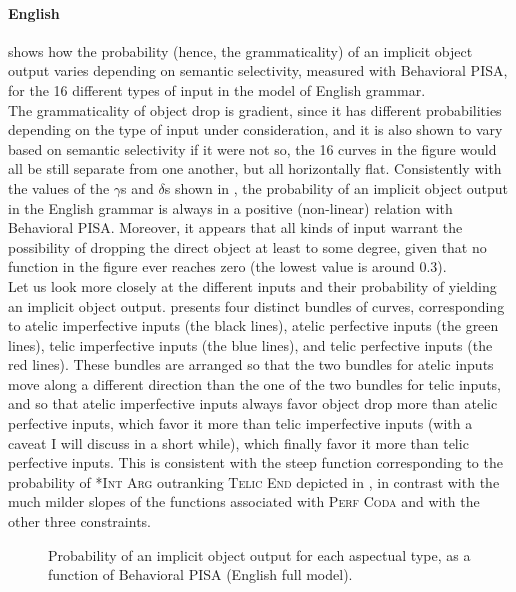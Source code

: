\paragraph{English} 
 shows how the probability (hence, the grammaticality) of an implicit object output varies depending on semantic selectivity, measured with Behavioral PISA, for the 16 different types of input in the model of English grammar.\\
The grammaticality of object drop is gradient, since it has different probabilities depending on the type of input under consideration, and it is also shown to vary based on semantic selectivity \textemdash if it were not so, the 16 curves in the figure would all be still separate from one another, but all horizontally flat. Consistently with the values of the $\gamma$s and $\delta$s shown in , the probability of an implicit object output in the English grammar is always in a positive (non-linear) relation with Behavioral PISA. Moreover, it appears that all kinds of input warrant the possibility of dropping the direct object at least to some degree, given that no function in the figure ever reaches zero (the lowest value is around 0.3).\\
Let us look more closely at the different inputs and their probability of yielding an implicit object output.  presents four distinct bundles of curves, corresponding to atelic imperfective inputs (the black lines), atelic perfective inputs (the green lines), telic imperfective inputs (the blue lines), and telic perfective inputs (the red lines). These bundles are arranged so that the two bundles for atelic inputs move along a different direction than the one of the two bundles for telic inputs, and so that atelic imperfective inputs always favor object drop more than atelic perfective inputs, which favor it more than telic imperfective inputs (with a caveat I will discuss in a short while), which finally favor it more than telic perfective inputs. This is consistent with the steep function corresponding to the probability of \textsc{*Int Arg} outranking \textsc{Telic End} depicted in , in contrast with the much milder slopes of the functions associated with \textsc{Perf Coda} and with the other three constraints.

\begin{figure}[htb]
\caption{Probability of an implicit object output for each aspectual type, as a function of Behavioral PISA (English full model).}
    
\end{figure}

